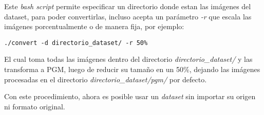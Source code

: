 Este \emph{bash script} permite especificar un directorio donde estan las imágenes del dataset, para poder convertirlas, incluso acepta un parámetro \emph{-r} que escala las imágenes porcentualmente o de manera fija, por ejemplo:

\begin{verbatim}
./convert -d directorio_dataset/ -r 50%
\end{verbatim}

El cual toma todas las imágenes dentro del directorio \emph{directorio\_dataset\slash} y las transforma a PGM, luego de reducir su tamaño en un 50\%, dejando las imágenes procesadas en el directorio \emph{directorio\_dataset\slash pgm\slash} por defecto.

Con este procedimiento, ahora es posible usar un \emph{dataset} sin importar su origen ni formato original.